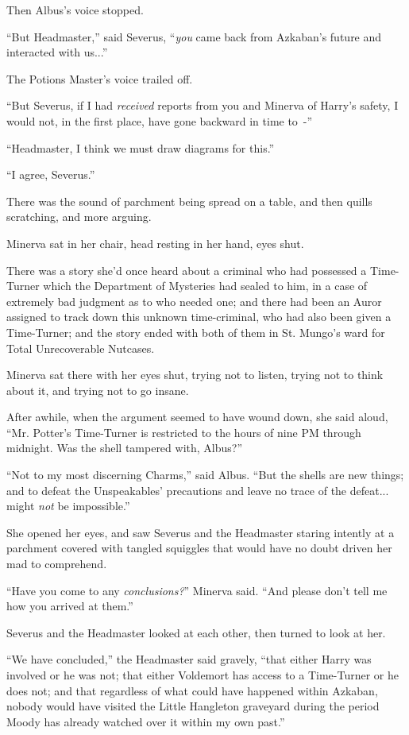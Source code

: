 Then Albus's voice stopped.

``But Headmaster,'' said Severus, ``\emph{you} came back from Azkaban's future and interacted with us...''

The Potions Master's voice trailed off.

``But Severus, if I had \emph{received} reports from you and Minerva of Harry's safety, I would not, in the first place, have gone backward in time to~-''

``Headmaster, I think we must draw diagrams for this.''

``I agree, Severus.''

There was the sound of parchment being spread on a table, and then quills scratching, and more arguing.

Minerva sat in her chair, head resting in her hand, eyes shut.

There was a story she'd once heard about a criminal who had possessed a Time-Turner which the Department of Mysteries had sealed to him, in a case of extremely bad judgment as to who needed one; and there had been an Auror assigned to track down this unknown time-criminal, who had also been given a Time-Turner; and the story ended with both of them in St. Mungo's ward for Total Unrecoverable Nutcases.

Minerva sat there with her eyes shut, trying not to listen, trying not to think about it, and trying not to go insane.

After awhile, when the argument seemed to have wound down, she said aloud, ``Mr. Potter's Time-Turner is restricted to the hours of nine PM through midnight. Was the shell tampered with, Albus?''

``Not to my most discerning Charms,'' said Albus. ``But the shells are new things; and to defeat the Unspeakables' precautions and leave no trace of the defeat... might \emph{not} be impossible.''

She opened her eyes, and saw Severus and the Headmaster staring intently at a parchment covered with tangled squiggles that would have no doubt driven her mad to comprehend.

``Have you come to any \emph{conclusions?}'' Minerva said. ``And please don't tell me how you arrived at them.''

Severus and the Headmaster looked at each other, then turned to look at her.

``We have concluded,'' the Headmaster said gravely, ``that either Harry was involved or he was not; that either Voldemort has access to a Time-Turner or he does not; and that regardless of what could have happened within Azkaban, nobody would have visited the Little Hangleton graveyard during the period Moody has already watched over it within my own past.''


